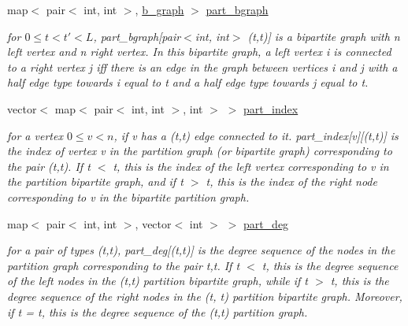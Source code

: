 \begin{DoxyCompactItemize}
map$<$ pair$<$ int, int $>$, \hyperlink{classb__graph}{b\+\_\+graph} $>$ \hyperlink{classmarked__graph__encoder_a5faebef707fb681c0b6c2ccf64abc04c}{part\+\_\+bgraph}
\begin{DoxyCompactList}\small\item\em for $0 \leq t < t' < L$, part\+\_\+bgraph\mbox{[}pair$<$int, int$>$ (t,t\textquotesingle{})\mbox{]} is a bipartite graph with n left vertex and n right vertex. In this bipartite graph, a left vertex i is connected to a right vertex j iff there is an edge in the graph between vertices i and j with a half edge type towards i equal to t and a half edge type towards j equal to t\textquotesingle{}. \end{DoxyCompactList}\item 
vector$<$ map$<$ pair$<$ int, int $>$, int $>$ $>$ \hyperlink{classmarked__graph__encoder_a1d3e2b90f5d46244fd4cb33c69ac81f1}{part\+\_\+index}
\begin{DoxyCompactList}\small\item\em for a vertex $0 \leq v < n$, if v has a (t,t\textquotesingle{}) edge connected to it. part\+\_\+index\mbox{[}v\mbox{]}\mbox{[}(t,t\textquotesingle{})\mbox{]} is the index of vertex v in the partition graph (or bipartite graph) corresponding to the pair (t,t\textquotesingle{}). If t $<$ t\textquotesingle{}, this is the index of the left vertex corresponding to v in the partition bipartite graph, and if t $>$ t\textquotesingle{}, this is the index of the right node corresponding to v in the bipartite partition graph. \end{DoxyCompactList}\item 
map$<$ pair$<$ int, int $>$, vector$<$ int $>$ $>$ \hyperlink{classmarked__graph__encoder_a55ea2edb2609dfc287432f61900d6ad1}{part\+\_\+deg}
\begin{DoxyCompactList}\small\item\em for a pair of types (t,t\textquotesingle{}), part\+\_\+deg\mbox{[}(t,t\textquotesingle{})\mbox{]} is the degree sequence of the nodes in the partition graph corresponding to the pair t,t\textquotesingle{}. If t $<$ t\textquotesingle{}, this is the degree sequence of the left nodes in the (t,t\textquotesingle{}) partition bipartite graph, while if t $>$ t\textquotesingle{}, this is the degree sequence of the right nodes in the (t\textquotesingle{}, t) partition bipartite graph. Moreover, if t = t\textquotesingle{}, this is the degree sequence of the (t,t) partition graph. \end{DoxyCompactList}\item 

\end{DoxyCompactItemize}
